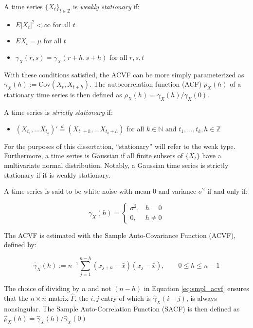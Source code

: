 





A time series $\{X_t\}_{t\in \mathbb{Z}}$ is \emph{weakly stationary} if:
\begin{itemize}
    \item[i] $E|X_t|^2 < \infty$ for all $t$
    \item[ii] $EX_t = \mu$ for all $t$
    \item[iii] $\gamma_X(r,s) = \gamma_X(r + h, s + h)$ for all $r,s,t$
\end{itemize}

With these conditions satisfied, the ACVF can be more simply parameterized as $\gamma_X(h):= \text{Cov}(X_t,X_{t+h})$. The autocorrelation function (ACF) $\rho_X(h)$ of a stationary time series is then defined as $\rho_X(h) = \gamma_X(h)/\gamma_X(0)$.


A time series is \emph{strictly stationary} if:


\begin{itemize}
    \item[] $(X_{t_1},...X_{t_k})' \overset{d}{=} (X_{t_1 + h},...X_{t_k + h})$ for all $k \in \mathbb{N}$ and $t_1,...,t_k,h \in \mathbb{Z}$
\end{itemize}

For the purposes of this dissertation, ``stationary'' will refer to the weak type. Furthermore, a time series is Gaussian if all finite subsets of $\{X_t\}$ have a multivariate normal distribution. Notably, a Gaussian time series is strictly stationary if it is weakly stationary.
 

A time series is said to be white noise with mean $0$ and variance $\sigma^2$ if and only if:

\begin{equation}
    \label{eq:wn}
    \gamma_X(h) = \begin{cases}
        \sigma^2, & h = 0 \\
        0, & h \neq 0
    \end{cases}
\end{equation}



The ACVF is estimated with the Sample Auto-Covariance Function (ACVF), defined by:

\begin{equation}
    \label{eq:smpl_acvf}
    \hat{\gamma}_X(h):= n^{-1}\sum_{j=1}^{n-h}(x_{j+h}-\bar{x})(x_j-\bar{x}), \qquad 0 \leq h \leq n-1
\end{equation}

The choice of dividing by $n$ and not $(n-h)$ in Equation \ref{eq:smpl_acvf} ensures that the $n \times n$ matrix $\hat{\Gamma}$, the $i,j$ entry of which is $\hat{\gamma}_X(i-j)$, is always nonsingular. The Sample Auto-Correlation Function (SACF) is then defined as $\hat{\rho}_X(h) = \hat{\gamma}_X(h)/\hat{\gamma}_X(0)$